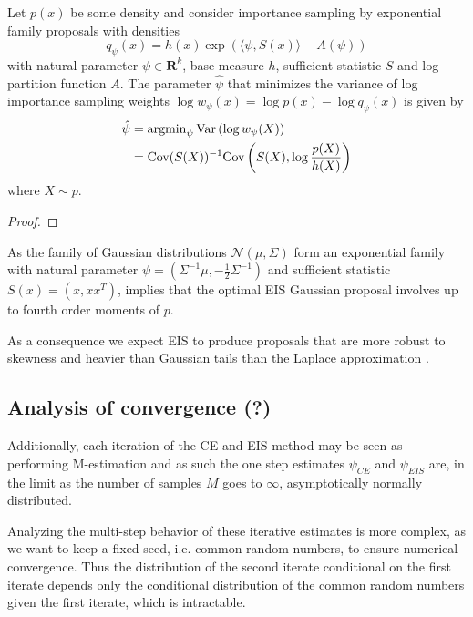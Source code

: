 \begin{theorem}
    \label{thm:optimal-eis}
    Let $p(x)$ be some density and consider importance sampling by exponential family proposals with densities $$q_\psi(x) = h(x) \exp\left( \langle \psi,S(x)\rangle - A(\psi)\right)$$ with natural parameter $\psi \in \mathbf{R}^{k}$, base measure $h$, sufficient statistic $S$ and log-partition function $A$. The parameter $\hat \psi$ that minimizes the variance of log importance sampling weights $\log w_{\psi}(x) = \log p(x) - \log q_{\psi}(x)$ is given by
    \begin{align*}
        \hat \psi & =  \operatorname{argmin} _{\psi} \text{Var} \left( \log w_{\psi}(X) \right)        \\
                  & = \text{Cov}(S(X))^{-1}\text{Cov}\left(S(X), \log \frac{p(X)}{h(X)}\right)
    \end{align*}
    where $X \sim p$.
\end{theorem}
\begin{proof}
\end{proof}

\begin{remark}
    As the family of Gaussian distributions $\mathcal N \left( \mu, \Sigma \right)$ form an exponential family with natural parameter $\psi = \left( \Sigma ^{-1} \mu, -\frac{1}{2}\Sigma^{-1} \right)$ and sufficient statistic $S(x) = \left( x, x x^{T} \right)$,  implies that the optimal EIS Gaussian proposal involves up to fourth order moments of $p$.

    As a consequence we expect EIS to produce proposals that are more robust to skewness and heavier than Gaussian tails than the Laplace approximation .
\end{remark}

\subsection{Analysis of convergence (?)}
\label{subsec:analysis-of-convergence}

Additionally, each iteration of the CE and EIS method may be seen as performing M-estimation and as such the one step estimates $\psi_{CE}$ and $\psi_{EIS}$ are, in the limit as the number of samples $M$ goes to $\infty$, asymptotically normally distributed.

Analyzing the multi-step behavior of these iterative estimates is more complex, as we want to keep a fixed seed, i.e. common random numbers, to ensure numerical convergence. Thus the distribution of the second iterate conditional on the first iterate depends only  the conditional distribution of the common random numbers given the first iterate, which is intractable.

